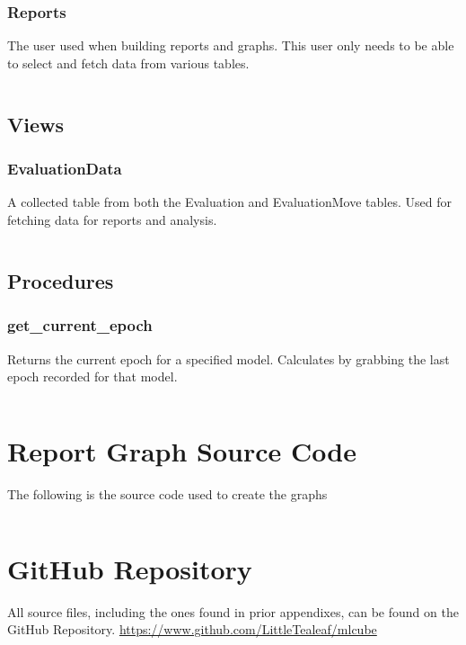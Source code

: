 \documentclass[12pt]{article}
\begin{document}
\subsubsection{Reports}

The user used when building reports and graphs. This user only needs to be able to select and fetch data from various tables.

\inputminted{SQL}{../../sql/users/reports.sql}

\subsection{Views}

\subsubsection{EvaluationData}

A collected table from both the Evaluation and EvaluationMove tables. Used for fetching data for reports and analysis.

\inputminted{SQL}{../../sql/views/EvaluationData.sql}

\subsection{Procedures}

\subsubsection{get\_current\_epoch}

Returns the current epoch for a specified model. Calculates by grabbing the last epoch recorded for that model.

\inputminted{SQL}{../../sql/procedures/get_current_epoch.sql}

\newpage

\section{Report Graph Source Code}

The following is the source code used to create the graphs

\inputminted{R}{../scripts/SER-300-Report.R}

\newpage

\section{GitHub Repository}

All source files, including the ones found in prior appendixes, can be found on the GitHub Repository. \url{https://www.github.com/LittleTealeaf/mlcube}
\end{document}
